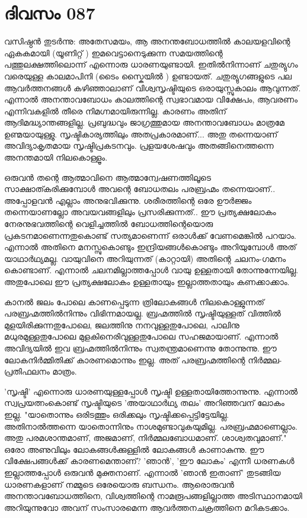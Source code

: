  
\section{ദിവസം 087}


വസിഷ്ഠന്‍ തുടര്‍ന്നു: അതേസമയം, ആ അനന്തബോധത്തില്‍ കാലയളവിന്റെ ഏകകമായി (യൂണിറ്റ്‌ )  ഇമവെട്ടാനെടുക്കുന്ന സമയത്തിന്റെ പത്തുലക്ഷത്തിലൊന്ന് എന്നൊരു ധാരണയുണ്ടായി. ഇതില്‍നിന്നാണ്‌ ചതുര്യുഗം വരെയുള്ള കാലമാപിനി (ടൈം സ്കൈയില്‍ ) ഉണ്ടായത്‌. ചതുര്യുഗങ്ങളുടെ പല ആവര്‍ത്തനങ്ങള്‍ കഴിഞ്ഞാലാണ്‌ വിശ്വസൃഷ്ടിയുടെ ഒരായുസ്സുകാലം ആവുന്നത്‌. എന്നാല്‍ അനന്താവബോധം കാലത്തിന്റെ സ്വഭാവമായ വിക്ഷേപം, ആവരണം എന്നിവകളില്‍ തീരെ നിമഗ്നമായിരുന്നില്ല. കാരണം അതിന്‌ ആദിമദ്ധ്യാന്തങ്ങളില്ല. പ്രബുദ്ധവും ജാഗ്രത്തുമായ അനന്താവബോധം മാത്രമേ ഉണ്മയായുള്ളു. സൃഷ്ടികാര്യത്തിലും അതപ്രകാരമാണ്‌... അതു തന്നെയാണ്‌ അവിദ്യാകൃതമായ സൃഷ്ടിപ്രകടനവും. പ്രളയശേഷവും അതങ്ങിനെത്തന്നെ അനന്തമായി നിലകൊള്ളൂം. 

ഒരുവന്‍ തന്റെ ആത്മാവിനെ ആത്മാന്വേഷണത്തിലൂടെ സാക്ഷാത്കരിക്കുമ്പോള്‍ അവന്റെ ബോധതലം പരബ്രഹ്മം തന്നെയാണ്‌..  അപ്പോളവന്‍ എല്ലാം അനുഭവിക്കുന്നു. ശരീരത്തിന്റെ ഒരേ ഊര്‍ജ്ജം തന്നെയാണല്ലോ അവയവങ്ങളിലും പ്രസരിക്കുന്നത്‌.. ഈ പ്രത്യക്ഷലോകം നേരനുഭവത്തിന്റെ വെളിച്ചത്തില്‍ ബോധത്തിന്റെയൊരു പ്രകടനമാണെന്നതുകൊണ്ട്‌ സത്യമാണെന്ന് ഒരാള്‍ക്ക്‌ വേണമെങ്കില്‍ പറയാം. എന്നാല്‍ അതിനെ മനസ്സുകൊണ്ടും ഇന്ദ്രിയങ്ങള്‍കൊണ്ടും അറിയുമ്പോള്‍ അത്‌ യാഥാര്‍ഥ്യമല്ല. വായുവിനെ അറിയുന്നത്‌ (കാറ്റായി) അതിന്റെ ചലനം-ഗമനം കൊണ്ടാണ്‌. എന്നാല്‍ ചലനമില്ലാത്തപ്പോള്‍ വായു ഉള്ളതായി തോന്നുന്നേയില്ല. അതുപോലെ ഈ പ്രത്യക്ഷലോകം ഉള്ളതായും ഇല്ലാത്തതായും കണക്കാക്കാം. 


കാനല്‍ ജലം പോലെ കാണപ്പെടുന്ന ത്രിലോകങ്ങള്‍ നിലകൊള്ളുന്നത്‌ പരബ്രഹ്മത്തില്‍നിന്നും വിഭിന്നമായല്ല. ബ്രഹ്മത്തില്‍ സൃഷ്ടിയുള്ളത്‌ വിത്തില്‍ മുളയിരിക്കുന്നതുപോലെ, ജലത്തിനു നനവുള്ളതുപോലെ, പാലിനു മധുരമുള്ളതുപോലെ മുളകിനെരിവുള്ളതുപോലെ സഹജമായാണ്‌. എന്നാല്‍ അവിദ്യയില്‍ ഇവ ബ്രഹ്മത്തില്‍നിന്നും സ്വതന്ത്രമാണെന്നു തോന്നുന്നു. ഈ ലോകനിര്‍മ്മിതിക്ക്‌ കാരണമൊന്നും ഇല്ല. അത്‌ പരബ്രഹ്മത്തിന്റെ നിര്‍മ്മല-പ്രതിഫലനം മാത്രം.

'സൃഷ്ടി' എന്നൊരു ധാരണയുള്ളപ്പോള്‍ സൃഷ്ടി ഉള്ളതായിത്തോന്നുന്നു. എന്നാല്‍ സ്വപ്രയത്നംകൊണ്ട്‌ സൃഷ്ടിയുടെ 'അയാഥാര്‍ഥ്യ തലം' അറിഞ്ഞവന്‌ ലോകം ഇല്ല. "യാതൊന്നും ഒരിടത്തും ഒരിക്കലും സൃഷ്ടിക്കപ്പെട്ടിട്ടേയില്ല. അതിനാല്‍ത്തന്നെ യാതൊന്നിനും നാശമുണ്ടാവുകയുമില്ല. പരബ്രഹ്മമാണെല്ലാം. അതു പരമശാന്തമാണ്‌, അജമാണ്‌, നിര്‍മ്മലബോധമാണ്‌. ശാശ്വതവുമാണ്‌." ഒരോ അണുവിലും ലോകങ്ങള്‍ക്കുള്ളില്‍ ലോകങ്ങള്‍ കാണാകുന്നു. ഈ വിക്ഷേപങ്ങള്‍ക്ക്‌ കാരണമെന്താണ്‌? 'ഞാന്‍', 'ഈ ലോകം' എന്നീ ധരണകള്‍ ഇല്ലാത്തപ്പോള്‍ ഒരുവന്‍ മുക്തനാണ്‌. എന്നാല്‍ 'ഞാന്‍ ഇതാണ്‌' തുടങ്ങിയ ധാരണകളാണ്‌ നമ്മുടെ ഒരേയൊരു ബന്ധനം. ആരൊരുവന്‍ അനന്താവബോധത്തിനെ, വിശ്വത്തിന്റെ നാമരൂപങ്ങളില്ലാത്ത അടിസ്ഥാനമായി അറിയുന്നുവോ അവന്‌ സംസാരമെന്ന ആവര്‍ത്തനചക്രത്തിനെ മറികടക്കാം.
